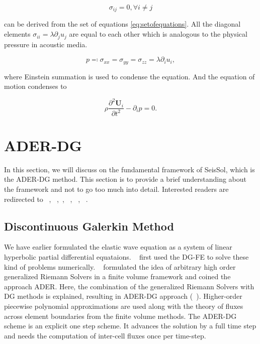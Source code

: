 \begin{equation}
    \sigma_{ij} = 0, \forall i \neq j
\end{equation}

can be derived from the set of equations \ref{eq:setofequations}. All the diagonal elements $\sigma_{ii} = \lambda \partial_j u_j$
are equal to each other which is analogous to the physical pressure in acoustic media. 

\begin{equation}
    p \eqcolon \sigma_{xx} = \sigma_{yy} = \sigma_{zz} = \lambda \partial_iu_i,
\end{equation}

where Einstein summation is used to condense the equation. And the equation of motion condenses to

\begin{equation}
    \rho \frac{\partial^2 \mathbf{U}_i}{\partial t^2} - \partial_i p = 0.
\end{equation}

\section{\ac{ADER}-\ac{DG}}\label{section:ADER-DG}

In this section, we will discuss on the fundamental framework of SeisSol, which is the \ac{ADER}-\ac{DG} method. This section is to provide
a brief understanding about the framework and not to go too much into detail. Interested readers are redirected to ~\parencite{martin}, ~\parencite{Toro2002},~\parencite{dumbser1}, ~\parencite{DUMBSER2005683}, ~\parencite{Toro2001}, ~\parencite{seissol}.

\subsection[DG method]{Discontinuous Galerkin Method}\label{subsection:DG}

We have earlier formulated the elastic wave equation as a system of linear hyperbolic partial differential equataions. ~\parencite{osti_4491151}
first used the \ac{DG-FE} to solve these kind of problems numerically. ~\parencite{Toro2001} formulated the idea of arbitrary high order generalized
Riemann Solvers in a finite volume framework and coined the approach \ac{ADER}. Here, the combination of the generalized Riemann Solvers with \ac{DG}
methods is explained, resulting in \ac{ADER}-\ac{DG} approach (~\parencite{Dumbser2006}). Higher-order piecewise polynomial approximations are used
along with the theory of fluxes across element boundaries from the finite volume methods. The \ac{ADER}-\ac{DG} scheme is an explicit one step scheme.
It advances the solution by a full time step and needs the computation of inter-cell fluxes once per time-step. \\

